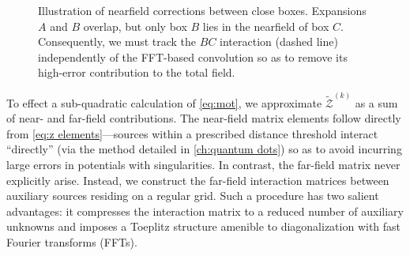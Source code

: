 \begin{figure}
  \centering
  \caption{\label{fig:nearfield correction}Illustration of nearfield corrections between close boxes.
    Expansions $A$ and $B$ overlap, but only box $B$ lies in the nearfield of box $C$.
    Consequently, we must track the $BC$ interaction (dashed line) independently of the FFT-based convolution so as to remove its high-error contribution to the total field.
  }
\end{figure}

To effect a sub-quadratic calculation of \cref{eq:mot}, we approximate $\tilde{\mathcal{Z}}^{(k)}$ as a sum of near- and far-field contributions.
The near-field matrix elements follow directly from \cref{eq:z elements}---sources within a prescribed distance threshold interact ``directly'' (via the method detailed in \cref{ch:quantum dots}) so as to avoid incurring large errors in potentials with singularities.
In contrast, the far-field matrix never explicitly arise.
Instead, we construct the far-field interaction matrices between auxiliary sources residing on a regular grid.
Such a procedure has two salient advantages: it compresses the interaction matrix to a reduced number of auxiliary unknowns and imposes a Toeplitz structure amenible to diagonalization with fast Fourier transforms (FFTs).

